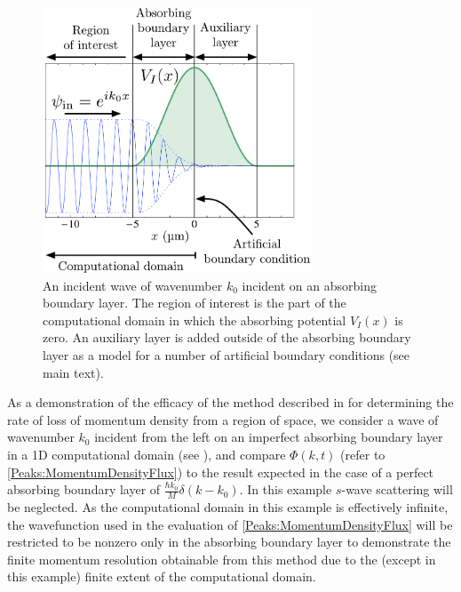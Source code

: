 \begin{figure}
    \centering
    \includegraphics[width=8cm]{AbsorbingBoundaryLayerScattering}
    \caption{\label{MethodsAppendix:AbsorbingBoundaryLayerScattering} An incident wave of wavenumber $k_0$ incident on an absorbing boundary layer. The region of interest is the part of the computational domain in which the absorbing potential $V_I(x)$ is zero. An auxiliary layer is added outside of the absorbing boundary layer as a model for a number of artificial boundary conditions (see main text).}
\end{figure}

As a demonstration of the efficacy of the method described in  for determining the rate of loss of momentum density from a region of space, we consider a wave of wavenumber $k_0$ incident from the left on an imperfect absorbing boundary layer in a 1D computational domain (see ), and compare $\Phi(k, t)$ (refer to \eqref{Peaks:MomentumDensityFlux}) to the result expected in the case of a perfect absorbing boundary layer of $\displaystyle \frac{\hbar k_0}{M}\delta(k - k_0)$. In this example $s$-wave scattering will be neglected. As the computational domain in this example is effectively infinite, the wavefunction used in the evaluation of \eqref{Peaks:MomentumDensityFlux} will be restricted to be nonzero only in the absorbing boundary layer to demonstrate the finite momentum resolution obtainable from this method due to the (except in this example) finite extent of the computational domain.

